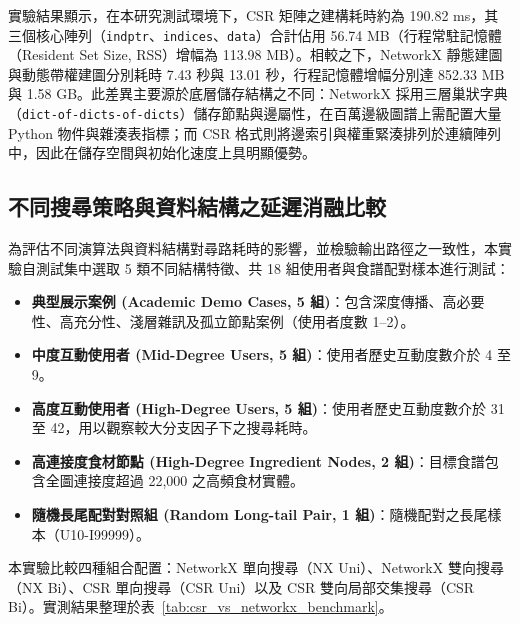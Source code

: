 \begin{table}[htbp]
  \centering
  \small
  \caption{不同圖資料結構於 720 萬邊全圖規模下之建構開銷對比}
  \label{tab:graph_construction_overhead}
\end{table}

實驗結果顯示，在本研究測試環境下，CSR 矩陣之建構耗時約為 190.82 ms，其三個核心陣列（\texttt{indptr}、\texttt{indices}、\texttt{data}）合計佔用 56.74 MB（行程常駐記憶體（Resident Set Size, RSS）增幅為 113.98 MB）。相較之下，NetworkX 靜態建圖與動態帶權建圖分別耗時 7.43 秒與 13.01 秒，行程記憶體增幅分別達 852.33 MB 與 1.58 GB。此差異主要源於底層儲存結構之不同：NetworkX 採用三層巢狀字典（\texttt{dict-of-dicts-of-dicts}）儲存節點與邊屬性，在百萬邊級圖譜上需配置大量 Python 物件與雜湊表指標；而 CSR 格式則將邊索引與權重緊湊排列於連續陣列中，因此在儲存空間與初始化速度上具明顯優勢。

\subsection{不同搜尋策略與資料結構之延遲消融比較}
為評估不同演算法與資料結構對尋路耗時的影響，並檢驗輸出路徑之一致性，本實驗自測試集中選取 5 類不同結構特徵、共 18 組使用者與食譜配對樣本進行測試：
\begin{itemize}
    \item \textbf{典型展示案例 (Academic Demo Cases, 5 組)}：包含深度傳播、高必要性、高充分性、淺層雜訊及孤立節點案例（使用者度數 1--2）。
    \item \textbf{中度互動使用者 (Mid-Degree Users, 5 組)}：使用者歷史互動度數介於 4 至 9。
    \item \textbf{高度互動使用者 (High-Degree Users, 5 組)}：使用者歷史互動度數介於 31 至 42，用以觀察較大分支因子下之搜尋耗時。
    \item \textbf{高連接度食材節點 (High-Degree Ingredient Nodes, 2 組)}：目標食譜包含全圖連接度超過 22,000 之高頻食材實體。
    \item \textbf{隨機長尾配對對照組 (Random Long-tail Pair, 1 組)}：隨機配對之長尾樣本（U10-I99999）。
\end{itemize}
本實驗比較四種組合配置：NetworkX 單向搜尋（NX Uni）、NetworkX 雙向搜尋（NX Bi）、CSR 單向搜尋（CSR Uni）以及 CSR 雙向局部交集搜尋（CSR Bi）。實測結果整理於表~\ref{tab:csr_vs_networkx_benchmark}。


